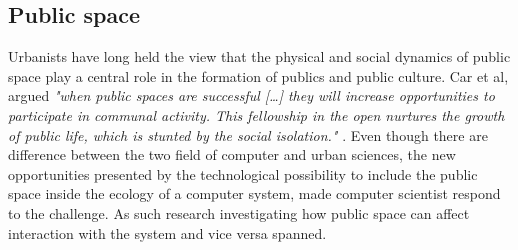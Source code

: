 \subsection{Public space}
Urbanists have long held the view that the physical and social dynamics of public space play a central role in the formation of publics and public culture. Car et al, argued \emph{"when public spaces are successful […] they will increase opportunities to participate in communal activity. This fellowship in the open nurtures the growth of public life, which is stunted by the social isolation."} \cite{carr:1992}. Even though there are difference between the two field of computer and urban sciences, the new opportunities presented by the technological possibility to include the public space inside the ecology of a computer system, made computer scientist respond to the challenge. As such research investigating how public space can affect interaction with the system and vice versa spanned.